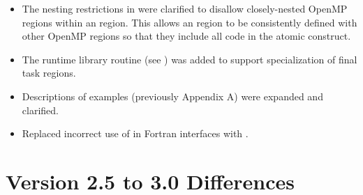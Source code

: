 \begin{itemize}
\item The nesting restrictions in  were clarified 
      to disallow closely-nested OpenMP regions within an  region. 
      This allows an  region to be consistently defined with other 
      OpenMP regions so that they include all code in the atomic construct.

\item The  runtime library routine 
      (see ) was added to support specialization 
      of final task regions.

\item Descriptions of examples (previously Appendix A) were expanded and clarified.

\item Replaced incorrect use of  in Fortran interfaces with
      .
\end{itemize}



\section{Version 2.5 to 3.0 Differences}
\label{sec:Version 2.5 to 3.0 Differences}

